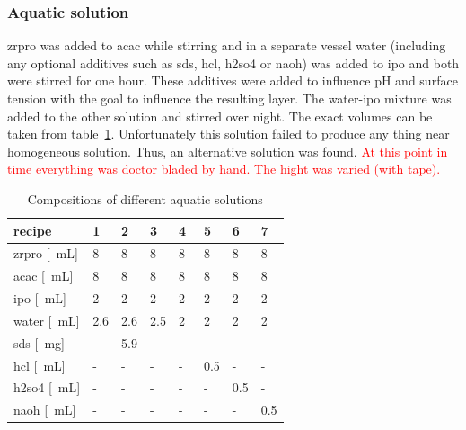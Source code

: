 \documentclass[a4paper]{article}
\newcommand{\td}[1]{\textcolor{red}{#1}}
\newcommand{\me}[1]{\textcolor{gray}{#1}}
\newcommand{\mg}[1]{\SI{#1}{\milli\gram}}
\newcommand{\ml}[1]{\SI{#1}{\milli\liter}}
\begin{document}
\subsubsection{Aquatic solution}
\gls{zrpro} was added to \gls{acac} while stirring and in a separate vessel \gls{water} 
(including any optional additives such as \gls{sds}, \gls{hcl}, \gls{h2so4} or \gls{naoh}) 
was added to \gls{ipo} and both were stirred for one hour. 
These additives were added to influence pH and surface tension with the goal to influence the resulting layer.
The \gls{water}-\gls{ipo} mixture was added to the other solution and stirred over night. 
The exact volumes can be taken from table~\ref{tab:rec1}.
Unfortunately this solution failed to produce any thing near homogeneous solution. 
Thus, an alternative solution was found.
\td{At this point in time everything was doctor bladed by hand. The hight was varied (with tape).}
\begin{table}[h]
	\centering
	\caption{Compositions of different aquatic solutions}
	\label{tab:rec1}
	\begin{tabular}{llllllll}
		\hline
		recipe				&1		&2		&3		&4		&5		&6		&7\\
		\hline
		\gls{zrpro} [\ml{}]	&8		&8		&8		&8		&8		&8		&8\\
		\gls{acac}  [\ml{}]	&8		&8		&8		&8		&8		&8		&8\\
		\gls{ipo}   [\ml{}]	&2		&2		&2		&2		&2		&2		&2\\
		\gls{water} [\ml{}]	&2.6	&2.6	&2.5	&2~		&2		&2		&2\\
		\gls{sds}   [\mg{}]	&-		&5.9	&-		&-		&-		&-		&-\\
		\gls{hcl}   [\ml{}]	&-		&-		&-		&-		&0.5	&-		&-\\
		\gls{h2so4} [\ml{}]	&-		&-		&-		&-		&-		&0.5	&-\\
		\gls{naoh}  [\ml{}] &-		&-		&-		&-		&-		&-		&0.5\\
		\hline
	\end{tabular}
\end{table}
%
\end{document}
